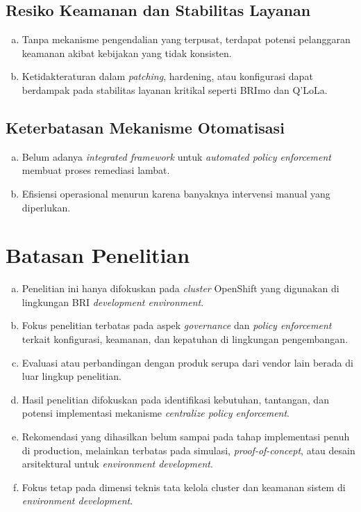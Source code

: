 \subsection{Resiko Keamanan dan Stabilitas Layanan}
\begin{adjustwidth}{0.5cm}{0cm}
  \begin{enumerate}[a.]
    \item Tanpa mekanisme pengendalian yang terpusat, terdapat potensi pelanggaran keamanan akibat kebijakan yang tidak konsisten.
    \item Ketidakteraturan dalam \emph{patching}, hardening, atau konfigurasi dapat berdampak pada stabilitas layanan kritikal seperti BRImo dan Q’LoLa.
  \end{enumerate}
\end{adjustwidth}

\subsection{Keterbatasan Mekanisme Otomatisasi}
\begin{adjustwidth}{0.5cm}{0cm}
  \begin{enumerate}[a.]
    \item Belum adanya \emph{integrated framework} untuk \emph{automated policy enforcement} membuat proses remediasi lambat.
    \item Efisiensi operasional menurun karena banyaknya intervensi manual yang diperlukan.
  \end{enumerate}
\end{adjustwidth}

\section{Batasan Penelitian}

\begin{adjustwidth}{0.5cm}{0cm}
  \begin{enumerate}[a.]
    \item Penelitian ini hanya difokuskan pada \emph{cluster} OpenShift yang digunakan di lingkungan BRI \emph{development environment}.
    \item Fokus penelitian terbatas pada aspek \emph{governance} dan \emph{policy enforcement} terkait konfigurasi, keamanan, dan kepatuhan di lingkungan pengembangan.
    \item Evaluasi atau perbandingan dengan produk serupa dari vendor lain berada di luar lingkup penelitian.
    \item Hasil penelitian difokuskan pada identifikasi kebutuhan, tantangan, dan potensi implementasi mekanisme \emph{centralize policy enforcement}.
    \item Rekomendasi yang dihasilkan belum sampai pada tahap implementasi penuh di production, melainkan terbatas pada simulasi, \emph{proof-of-concept}, atau desain arsitektural untuk \emph{environment development}.
    \item Fokus tetap pada dimensi teknis tata kelola cluster dan keamanan sistem di \emph{environment development}.
  \end{enumerate}
\end{adjustwidth}

